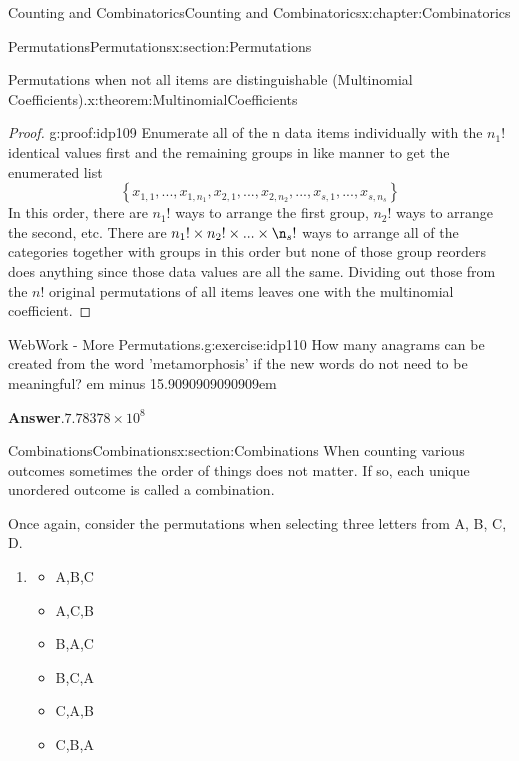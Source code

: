 \documentclass[oneside,10pt,]{book}
\newcommand{\blocktitlefont}{\relax}
\newcommand{\fillin}[1]{\leavevmode\leaders\vrule height -1.2pt depth 1.5pt \hskip #1em minus #1em \null}
\numberwithin{equation}{section}
\begin{document}
\begin{chapterptx}{Counting and Combinatorics}{}{Counting and Combinatorics}{}{}{x:chapter:Combinatorics}
\begin{sectionptx}{Permutations}{}{Permutations}{}{}{x:section:Permutations}
\begin{theorem}{Permutations when not all items are distinguishable (Multinomial Coefficients).}{}{x:theorem:MultinomialCoefficients}
%
\end{theorem}
\begin{proof}{}{g:proof:idp109}
Enumerate all of the n data items individually with the \(n_1!\) identical values first and the remaining groups in like manner to get the enumerated list%
\begin{equation*}
\left \{ x_{1,1}, ..., x_{1,n_1}, x_{2,1}, ..., x_{2,n_2}, ... , x_{s,1}, ..., x_{s,n_s} \right \}
\end{equation*}
In this order, there are \(n_1!\) ways to arrange the first group, \(n_2!\) ways to arrange the second, etc. There are \(n_1! \times n_2! \times ... \times \n_s!\) ways to arrange all of the categories together with groups in this order but none of those group reorders does anything since those data values are all the same. Dividing out those from the \(n!\) original permutations of all items leaves one with the multinomial coefficient.%
\end{proof}
\begin{inlineexercise}{WebWork - More Permutations.}{g:exercise:idp110}%
How many anagrams can be created from the word 'metamorphosis' if the new words do not need to be meaningful? \fillin{15.9090909090909}%
\par\smallskip%
\noindent\textbf{\blocktitlefont Answer}.\hypertarget{g:answer:idp111}{}\quad{}\(7.78378\times 10^{8}\)%
\end{inlineexercise}%
\end{sectionptx}
%
%
\typeout{************************************************}
\typeout{************************************************}
%
\begin{sectionptx}{Combinations}{}{Combinations}{}{}{x:section:Combinations}
When counting various outcomes sometimes the order of things does not matter. If so, each unique unordered outcome is called a combination.%
\par
Once again, consider the permutations when selecting three letters from \textbraceleft{}A, B, C, D\textbraceright{}.%
\begin{enumerate}
\item{}%
\begin{itemize}[label=\textbullet]
\item{}A,B,C%
\item{}A,C,B%
\item{}B,A,C%
\item{}B,C,A%
\item{}C,A,B%
\item{}C,B,A%

\end{itemize}
\end{enumerate}
\end{sectionptx}
\end{chapterptx}
\end{document}
